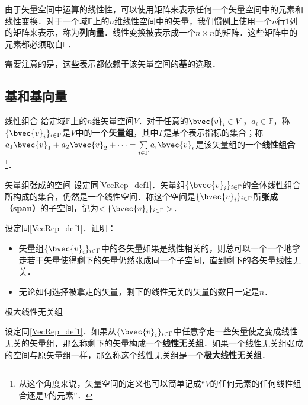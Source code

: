 

由于矢量空间中运算的线性性，可以使用矩阵来表示任何一个矢量空间中的元素和线性变换．对于一个域$\mathbb{F}$上的$n$维线性空间中的矢量，我们惯例上使用一个$n$行$1$列的矩阵来表示，称为\textbf{列向量}．线性变换被表示成一个$n\times n$的矩阵．这些矩阵中的元素都必须取自$\mathbb{F}$．

需要注意的是，这些表示都依赖于该矢量空间的\textbf{基}的选取．

\subsection{基和基向量}

\begin{definition}{线性组合}\label{VecRep_def1}
给定域$\mathbb{F}$上的$n$维矢量空间$V$．对于任意的$\bvec{v}_i\in V$，$a_i\in\mathbb{F}$，称$\{\bvec{v}_i\}_{i\in\Gamma}$是$V$中的一个\textbf{矢量组}，其中$\Gamma$是某个表示指标的集合；称$a_1\bvec{v}_1+a_2\bvec{v}_2+\cdots=\sum\limits_{i\in\Gamma}a_i\bvec{v}_i$是该矢量组的一个\textbf{线性组合}\footnote{从这个角度来说，矢量空间的定义也可以简单记成“$V$的任何元素的任何线性组合还是$V$的元素”．}．
\end{definition}

\begin{definition}{矢量组张成的空间}
设定同\autoref{VecRep_def1}．矢量组$\{\bvec{v}_i\}_{i\in\Gamma}$的全体线性组合所构成的集合，仍然是一个线性空间．称这个空间是$\{\bvec{v}_i\}_{i\in\Gamma}$所\textbf{张成（span）}的子空间，记为$<\{\bvec{v}_i\}_{i\in\Gamma}>$．
\end{definition}

\begin{exercise}{}
设定同\autoref{VecRep_def1}．证明：
\begin{itemize}
\item 矢量组$\{\bvec{v}_i\}_{i\in\Gamma}$中的各矢量如果是线性相关的，则总可以一个一个地拿走若干矢量使得剩下的矢量仍然张成同一个子空间，直到剩下的各矢量线性无关．
\item 无论如何选择被拿走的矢量，剩下的线性无关的矢量的数目一定是$n$．
\end{itemize}
\end{exercise}

\begin{definition}{极大线性无关组}

设定同\autoref{VecRep_def1}．如果从$\{\bvec{v}_i\}_{i\in\Gamma}$中任意拿走一些矢量使之变成线性无关的矢量组，那么称剩下的矢量构成一个\textbf{线性无关组}．如果一个线性无关组张成的空间与原矢量组一样，那么称这个线性无关组是一个\textbf{极大线性无关组}．

\end{definition}

